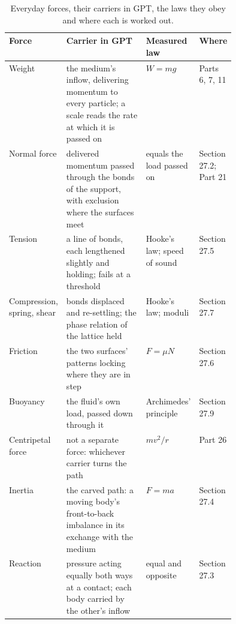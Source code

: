 \begin{table}[t]\centering\small
\caption{Everyday forces, their carriers in GPT, the laws they obey and where each is worked out.}
\begin{tabularx}{\linewidth}{@{}>{\raggedright}p{0.15\linewidth} X >{\raggedright}p{0.16\linewidth} >{\raggedright\arraybackslash}p{0.13\linewidth}@{}}\toprule
\textbf{Force} & \textbf{Carrier in GPT} & \textbf{Measured law} & \textbf{Where}\\\midrule
Weight & the medium's inflow, delivering momentum to every particle; a scale reads the rate at which it is passed on & $W=mg$ & Parts 6, 7, 11\\
Normal force & delivered momentum passed through the bonds of the support, with exclusion where the surfaces meet & equals the load passed on & Section 27.2; Part 21\\
Tension & a line of bonds, each lengthened slightly and holding; fails at a threshold & Hooke's law; speed of sound & Section 27.5\\
Compression, spring, shear & bonds displaced and re-settling; the phase relation of the lattice held & Hooke's law; moduli & Section 27.7\\
Friction & the two surfaces' patterns locking where they are in step & $F=\mu N$ & Section 27.6\\
Buoyancy & the fluid's own load, passed down through it & Archimedes' principle & Section 27.9\\
Centripetal force & not a separate force: whichever carrier turns the path & $mv^2/r$ & Part 26\\
Inertia & the carved path: a moving body's front-to-back imbalance in its exchange with the medium & $F=ma$ & Section 27.4\\
Reaction & pressure acting equally both ways at a contact; each body carried by the other's inflow & equal and opposite & Section 27.3\\\bottomrule
\end{tabularx}\label{tab:carriers}\end{table}

